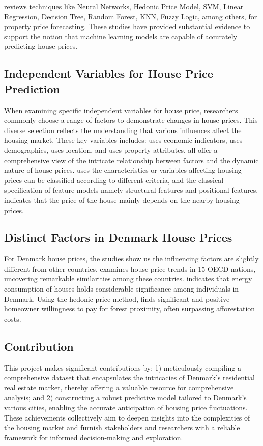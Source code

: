 \documentclass[12pt]{article} %
\begin{document}
{        \cite{mohdetal2020} reviews techniques like Neural Networks, Hedonic Price Model, SVM, Linear Regression, Decision Tree, Random Forest, KNN, Fuzzy Logic, among others, for property price forecasting. These studies have provided substantial evidence to support the notion that machine learning models are capable of accurately predicting house prices. 
\subsection{Independent Variables for House Price Prediction} 
        When examining specific independent variables for house price, researchers commonly choose a range of factors to demonstrate changes in house prices. This diverse selection reflects the understanding that various influences affect the housing market. These key variables includes: \cite{girouardetal2001} uses economic indicators, \cite{engelhardtetal1991} uses demographics, \cite{gelfandetal2004} uses location, and \cite{caseetal1991} uses property attributes, all offer a comprehensive view of the intricate relationship between factors and the dynamic nature of house prices. \cite{paceetal1998} uses the characteristics or variables affecting housing prices can be classified according to different criteria, and the classical specification of feature models namely structural features and positional features.  \cite{chicaetal2013} indicates that the price of the house mainly depends on the nearby housing prices.
\subsection{Distinct Factors in Denmark House Prices}
        For Denmark house prices, the studies show us the influencing factors are slightly different from other countries. \cite{englundetal1997} examines house price trends in 15 OECD nations, uncovering remarkable similarities among these countries. \cite{marshetal2010} indicates that energy consumption of houses holds considerable significance among individuals in Denmark. Using the hedonic price method, \cite{praestholmetal2002} finds significant and positive homeowner willingness to pay for forest proximity, often surpassing afforestation costs.

  
  
	\subsection{Contribution}
		This project makes significant contributions by: 1) meticulously compiling a comprehensive dataset that encapsulates the intricacies of Denmark's residential real estate market, thereby offering a valuable resource for comprehensive analysis; and 2) constructing a robust predictive model tailored to Denmark's various cities, enabling the accurate anticipation of housing price fluctuations. These achievements collectively aim to deepen insights into the complexities of the housing market and furnish stakeholders and researchers with a reliable framework for informed decision-making and exploration.

}
\end{document}
